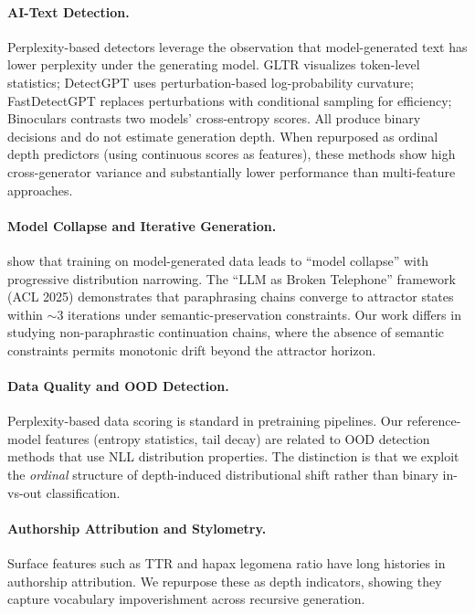 \documentclass[11pt,a4paper]{article}
\begin{document}
\paragraph{AI-Text Detection.}
Perplexity-based detectors leverage the observation that model-generated text has lower perplexity under the generating model. GLTR \cite{gehrmann2019gltr} visualizes token-level statistics; DetectGPT \cite{mitchell2023detectgpt} uses perturbation-based log-probability curvature; FastDetectGPT \cite{bao2024fast} replaces perturbations with conditional sampling for efficiency; Binoculars \cite{hans2024binoculars} contrasts two models' cross-entropy scores. All produce binary decisions and do not estimate generation depth. When repurposed as ordinal depth predictors (using continuous scores as features), these methods show high cross-generator variance and substantially lower performance than multi-feature approaches.

\paragraph{Model Collapse and Iterative Generation.}
\citet{shumailov2024ai} show that training on model-generated data leads to ``model collapse'' with progressive distribution narrowing. The ``LLM as Broken Telephone'' framework (ACL 2025) demonstrates that paraphrasing chains converge to attractor states within ${\sim}3$ iterations under semantic-preservation constraints. Our work differs in studying non-paraphrastic continuation chains, where the absence of semantic constraints permits monotonic drift beyond the attractor horizon.

\paragraph{Data Quality and OOD Detection.}
Perplexity-based data scoring is standard in pretraining pipelines. Our reference-model features (entropy statistics, tail decay) are related to OOD detection methods that use NLL distribution properties. The distinction is that we exploit the \textit{ordinal} structure of depth-induced distributional shift rather than binary in-vs-out classification.

\paragraph{Authorship Attribution and Stylometry.}
Surface features such as TTR and hapax legomena ratio have long histories in authorship attribution. We repurpose these as depth indicators, showing they capture vocabulary impoverishment across recursive generation.
\end{document}
